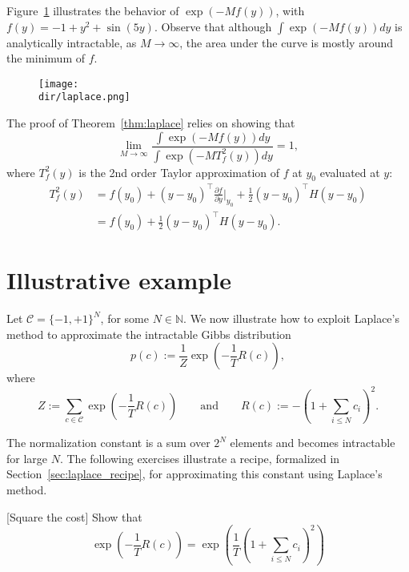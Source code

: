 Figure~\ref{fig:laplace} illustrates the behavior of $\exp\left(-M f(y)\right)$, with $f(y) = -1 + y^2 + \sin(5y)$. Observe that although $\int \exp\left(-M f(y)\right) dy$ is analytically intractable, as $M \to \infty$, the area under the curve is mostly around the minimum of $f$.

\begin{figure}[hbtp]
\centering
\texttt{[image: \\dir/laplace.png]}
\caption{}
\label{fig:laplace}
\end{figure}

The proof of Theorem~\ref{thm:laplace} relies on showing that
%
\begin{equation}
\lim_{M \to \infty} \frac{\displaystyle \int \exp\left(-M f(y)\right) dy}{\displaystyle \int \exp\left(-M T^2_f(y)\right) dy}=1,
\end{equation}
%
where $T^2_f(y)$ is the 2nd order Taylor approximation of $f$ at $y_0$ evaluated at $y$:
%
\begin{align}
T^2_f(y) &= f(y_0) + (y - y_0)^\top \frac{\partial f}{\partial y}\Bigr|_{y_0} + \frac{1}{2}(y - y_0)^\top H (y - y_0)\\
&= f(y_0) + \frac{1}{2}(y - y_0)^\top H (y - y_0).
\end{align}
%

\section{Illustrative example}

Let $\mathcal{C} = \{-1, +1\}^N$, for some $N \in \mathbb{N}$. We now illustrate how to exploit Laplace's method to approximate the intractable Gibbs distribution
%
\begin{equation}
p(c) := \frac{1}{Z}\exp\left(-\frac{1}{T}R(c)\right),
\end{equation}
%
where
%
\begin{equation}
Z := \sum_{c \in \mathcal{C}} \exp\left(-\frac{1}{T}R(c)\right) \qquad \text{and} \qquad R(c) := - \left(1 + \sum_{i \leq N}c_i\right)^2.
\end{equation}

The normalization constant is a sum over $2^N$ elements and becomes intractable for large $N$. The following exercises illustrate a recipe, formalized in Section~\ref{sec:laplace_recipe}, for approximating this constant using Laplace's method.

\begin{exercise}{[Square the cost]}
Show that
%
\begin{equation}
\exp\left(-\frac{1}{T}R(c)\right) = \exp\left(\frac{1}{T}\left(1 + \sum_{i \leq N}c_i\right)^2\right)
\end{equation}
%
\end{exercise}

